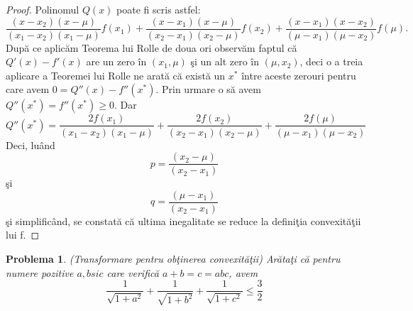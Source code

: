 \documentclass[a4paper,12pt,oneside]{report}
\newtheorem{problem}{Problema}
\begin{document}
\begin{proof}
Polinomul \(Q\left ( x \right )\) poate fi scris astfel:
\begin{displaymath}
  \frac{\left ( x - x_{2} \right )\left ( x - \mu  \right )}{\left ( x_{1}  - x_{2}\right )\left ( x_{1} - \mu  \right )} f\left ( x_{1} \right ) + \frac{\left ( x - x_{1} \right )\left ( x - \mu  \right )}{\left ( x_{2}  - x_{1}\right )\left ( x_{2} - \mu  \right )}  f\left ( x_{2} \right ) +  \frac{\left ( x - x_{1} \right )\left ( x - x_{2}  \right )}{\left ( \mu   - x_{1}\right )\left (  \mu - x_{2} \right )}f\left ( \mu \right ).
\end{displaymath}
Dup\u{a} ce aplic\u{a}m Teorema lui Rolle de doua ori observ\u{a}m faptul c\u{a}  \({Q}'\left ( x \right ) - {f}'\left ( x \right )\) are un zero \^{i}n \(\left ( x_{1} , \mu \right )\) \c{s}i un alt zero \^{i}n \(\left ( \mu  , x_{2} \right )\), deci o a treia aplicare a Teoremei lui Rolle ne arat\u{a} c\u{a} exist\u{a} un \(x^{*}\) \^{i}ntre aceste zerouri pentru care avem \(0 = {Q}''\left ( x \right ) - {f}''\left ( x^{*} \right )\). Prin urmare o s\u{a} avem \({Q}''\left ( x^{*}  \right ) = {f}''\left ( x^{*} \right )\geq 0\). Dar
\begin{displaymath}
  {Q}''\left ( x^{*}  \right ) = \frac{2f\left ( x_{1} \right )}{\left ( x_{1} - x_{2} \right )\left ( x_{1} - \mu  \right )} +  \frac{2f\left ( x_{2} \right )}{\left ( x_{2} - x_{1} \right )\left ( x_{2} - \mu  \right )} +  \frac{2f\left (\mu  \right )}{\left ( \mu  - x_{1} \right )\left ( \mu  - x_{2} \right )}
\end{displaymath}
Deci, lu\^{a}nd
\begin{displaymath}
  p = \frac{\left ( x_{2} - \mu  \right )}{\left ( x_{2} - x_{1}\right )}
\end{displaymath}
\c{s}i
\begin{displaymath}
  q = \frac{\left ( \mu  - x_{1} \right )}{\left ( x_{2} - x_{1} \right )}
\end{displaymath}
\c{s}i simplific\^{a}nd, se constat\u{a} c\u{a} ultima inegalitate se reduce la defini\c{t}ia convexit\u{a}\c{t}ii lui f.
\end{proof}
\begin{problem} (Transformare pentru ob\c{t}inerea convexit\u{a}\c{t}ii)
Ar\u{a}ta\c{t}i c\u{a} pentru numere pozitive \(a , b si c\) care verific\u{a} \(a + b = c = abc\), avem
\begin{displaymath}
  \frac{1}{\sqrt{1 + a^{2}}} + \frac{1}{\sqrt{1 + b^{2}}} + \frac{1}{\sqrt{1 + c^{2}}} \leq \frac{3}{2}
\end{displaymath}
\end{problem}
\end{document}
